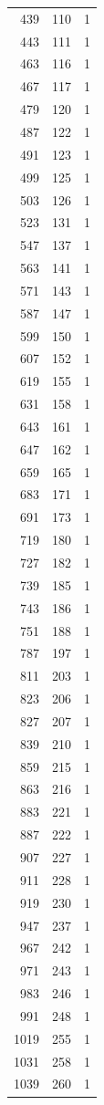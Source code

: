 \documentclass[11pt,a4paper]{article}
\theoremstyle{definition}
\theoremstyle{remark}
\begin{document}
\begin{longtable}{rrr}
439 & 110 & 1 \\
443 & 111 & 1 \\
463 & 116 & 1 \\
467 & 117 & 1 \\
479 & 120 & 1 \\
487 & 122 & 1 \\
491 & 123 & 1 \\
499 & 125 & 1 \\
503 & 126 & 1 \\
523 & 131 & 1 \\
547 & 137 & 1 \\
563 & 141 & 1 \\
571 & 143 & 1 \\
587 & 147 & 1 \\
599 & 150 & 1 \\
607 & 152 & 1 \\
619 & 155 & 1 \\
631 & 158 & 1 \\
643 & 161 & 1 \\
647 & 162 & 1 \\
659 & 165 & 1 \\
683 & 171 & 1 \\
691 & 173 & 1 \\
719 & 180 & 1 \\
727 & 182 & 1 \\
739 & 185 & 1 \\
743 & 186 & 1 \\
751 & 188 & 1 \\
787 & 197 & 1 \\
811 & 203 & 1 \\
823 & 206 & 1 \\
827 & 207 & 1 \\
839 & 210 & 1 \\
859 & 215 & 1 \\
863 & 216 & 1 \\
883 & 221 & 1 \\
887 & 222 & 1 \\
907 & 227 & 1 \\
911 & 228 & 1 \\
919 & 230 & 1 \\
947 & 237 & 1 \\
967 & 242 & 1 \\
971 & 243 & 1 \\
983 & 246 & 1 \\
991 & 248 & 1 \\
1019 & 255 & 1 \\
1031 & 258 & 1 \\
1039 & 260 & 1 \\
\bottomrule
\end{longtable}
\end{document}
